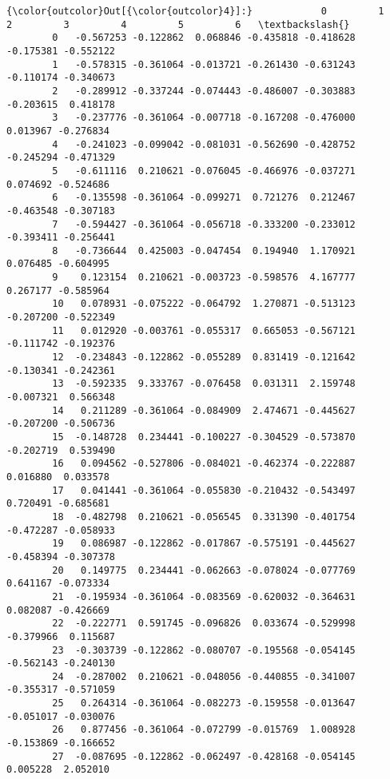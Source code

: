 \documentclass[11pt]{article}
\begin{document}
\begin{Verbatim}[commandchars=\\\{\}]
{\color{outcolor}Out[{\color{outcolor}4}]:}            0         1         2         3         4         5         6   \textbackslash{}
        0   -0.567253 -0.122862  0.068846 -0.435818 -0.418628 -0.175381 -0.552122   
        1   -0.578315 -0.361064 -0.013721 -0.261430 -0.631243 -0.110174 -0.340673   
        2   -0.289912 -0.337244 -0.074443 -0.486007 -0.303883 -0.203615  0.418178   
        3   -0.237776 -0.361064 -0.007718 -0.167208 -0.476000  0.013967 -0.276834   
        4   -0.241023 -0.099042 -0.081031 -0.562690 -0.428752 -0.245294 -0.471329   
        5   -0.611116  0.210621 -0.076045 -0.466976 -0.037271  0.074692 -0.524686   
        6   -0.135598 -0.361064 -0.099271  0.721276  0.212467 -0.463548 -0.307183   
        7   -0.594427 -0.361064 -0.056718 -0.333200 -0.233012 -0.393411 -0.256441   
        8   -0.736644  0.425003 -0.047454  0.194940  1.170921  0.076485 -0.604995   
        9    0.123154  0.210621 -0.003723 -0.598576  4.167777  0.267177 -0.585964   
        10   0.078931 -0.075222 -0.064792  1.270871 -0.513123 -0.207200 -0.522349   
        11   0.012920 -0.003761 -0.055317  0.665053 -0.567121 -0.111742 -0.192376   
        12  -0.234843 -0.122862 -0.055289  0.831419 -0.121642 -0.130341 -0.242361   
        13  -0.592335  9.333767 -0.076458  0.031311  2.159748 -0.007321  0.566348   
        14   0.211289 -0.361064 -0.084909  2.474671 -0.445627 -0.207200 -0.506736   
        15  -0.148728  0.234441 -0.100227 -0.304529 -0.573870 -0.202719  0.539490   
        16   0.094562 -0.527806 -0.084021 -0.462374 -0.222887  0.016880  0.033578   
        17   0.041441 -0.361064 -0.055830 -0.210432 -0.543497  0.720491 -0.685681   
        18  -0.482798  0.210621 -0.056545  0.331390 -0.401754 -0.472287 -0.058933   
        19   0.086987 -0.122862 -0.017867 -0.575191 -0.445627 -0.458394 -0.307378   
        20   0.149775  0.234441 -0.062663 -0.078024 -0.077769  0.641167 -0.073334   
        21  -0.195934 -0.361064 -0.083569 -0.620032 -0.364631  0.082087 -0.426669   
        22  -0.222771  0.591745 -0.096826  0.033674 -0.529998 -0.379966  0.115687   
        23  -0.303739 -0.122862 -0.080707 -0.195568 -0.054145 -0.562143 -0.240130   
        24  -0.287002  0.210621 -0.048056 -0.440855 -0.341007 -0.355317 -0.571059   
        25   0.264314 -0.361064 -0.082273 -0.159558 -0.013647 -0.051017 -0.030076   
        26   0.877456 -0.361064 -0.072799 -0.015769  1.008928 -0.153869 -0.166652   
        27  -0.087695 -0.122862 -0.062497 -0.428168 -0.054145  0.005228  2.052010   

\end{Verbatim}
\end{document}

